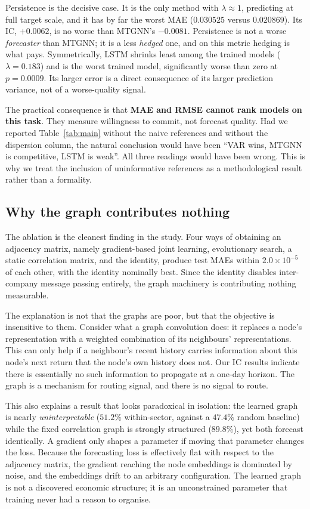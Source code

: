 Persistence is the decisive case. It is the only method with $\lambda \approx 1$, predicting at full target scale, and it has by far the worst MAE ($0.030525$ versus $0.020869$). Its IC, $+0.0062$, is no worse than MTGNN's $-0.0081$. Persistence is not a worse \emph{forecaster} than MTGNN; it is a less \emph{hedged} one, and on this metric hedging is what pays. Symmetrically, LSTM shrinks least among the trained models ($\lambda = 0.183$) and is the worst trained model, significantly worse than zero at $p = 0.0009$. Its larger error is a direct consequence of its larger prediction variance, not of a worse-quality signal.

The practical consequence is that \textbf{MAE and RMSE cannot rank models on this task}. They measure willingness to commit, not forecast quality. Had we reported Table~\ref{tab:main} without the naive references and without the dispersion column, the natural conclusion would have been ``VAR wins, MTGNN is competitive, LSTM is weak''. All three readings would have been wrong. This is why we treat the inclusion of uninformative references as a methodological result rather than a formality.

\subsection{Why the graph contributes nothing}

The ablation is the cleanest finding in the study. Four ways of obtaining an adjacency matrix, namely gradient-based joint learning, evolutionary search, a static correlation matrix, and the identity, produce test MAEs within $2.0 \times 10^{-5}$ of each other, with the identity nominally best. Since the identity disables inter-company message passing entirely, the graph machinery is contributing nothing measurable.

The explanation is not that the graphs are poor, but that the objective is insensitive to them. Consider what a graph convolution does: it replaces a node's representation with a weighted combination of its neighbours' representations. This can only help if a neighbour's recent history carries information about this node's next return that the node's own history does not. Our IC results indicate there is essentially no such information to propagate at a one-day horizon. The graph is a mechanism for routing signal, and there is no signal to route.

This also explains a result that looks paradoxical in isolation: the learned graph is nearly \emph{uninterpretable} ($51.2\%$ within-sector, against a $47.4\%$ random baseline) while the fixed correlation graph is strongly structured ($89.8\%$), yet both forecast identically. A gradient only shapes a parameter if moving that parameter changes the loss. Because the forecasting loss is effectively flat with respect to the adjacency matrix, the gradient reaching the node embeddings is dominated by noise, and the embeddings drift to an arbitrary configuration. The learned graph is not a discovered economic structure; it is an unconstrained parameter that training never had a reason to organise.

